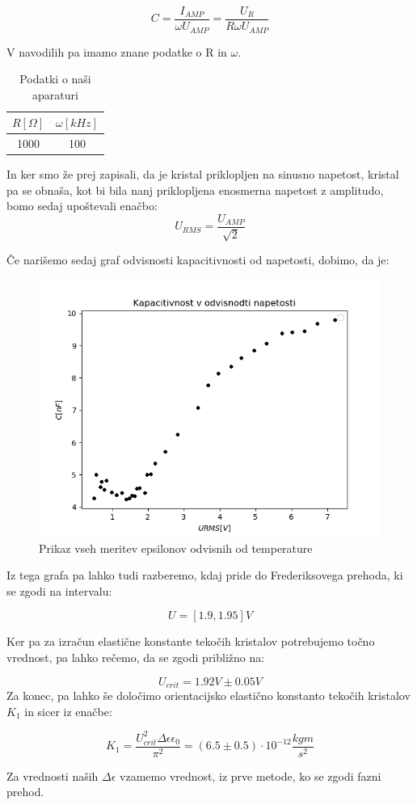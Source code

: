 \documentclass[11pt, a4paper]{article}
\theoremstyle{definition}
\theoremstyle{example}
\theoremstyle{izrek}
\begin{document}
$$C=\frac{I_{AMP}}{\omega U_{AMP}}=\frac{U_R}{R \omega U_{AMP}}$$

V navodilih pa imamo znane podatke o R in $\omega$.
\begin{table}[h]
	\centering
	\begin{tabular}{|c|c|}
		\hline
		$R [\Omega]$ & $\omega [kHz] $ \\
		\hline
		\hline
		1000 & 100\\
		\hline
	\end{tabular}
	\caption{Podatki o naši aparaturi}		\label{osnove}
\end{table}
In ker smo že prej zapisali, da je kristal priklopljen na sinusno napetost, kristal pa se obnaša, kot bi bila nanj priklopljena enosmerna napetost z amplitudo, bomo sedaj upoštevali enačbo:
\begin{equation}
\label{Sinusna-enosmerna napetost}
U_{RMS}= \frac{U_{AMP}}{\sqrt{2}}
\end{equation}

Če narišemo sedaj graf odvisnosti kapacitivnosti od napetosti, dobimo, da je:\\

\begin{figure}[H]
	\centering
    \includegraphics[width=12cm]{Kapacitivnost_napetost.png}
    \caption{Prikaz vseh meritev epsilonov odvisnih od temperature}
\end{figure}


Iz tega grafa pa lahko tudi razberemo, kdaj pride do Frederiksovega prehoda, ki se zgodi na intervalu:

$$U=[1.9, 1.95]V$$

Ker pa za izračun elastične konstante tekočih kristalov potrebujemo točno vrednost, pa lahko rečemo, da se zgodi približno na:

$$U_{crit}=1.92 V \pm 0.05 V$$
Za konec, pa lahko še določimo orientacijsko elastično konstanto tekočih kristalov $K_1$ in sicer iz enačbe: 

\begin{equation}
\label{Elastična konstanta}
K_1=\frac{U_{crit}^2 \Delta \epsilon \epsilon_0}{\pi^2}= (6.5 \pm 0.5)\cdot 10^{-12}\frac{kgm}{s^2}
\end{equation}

Za vrednosti naših $\Delta \epsilon $ vzamemo vrednost, iz prve metode, ko se zgodi fazni prehod. 
 
\end{document}
